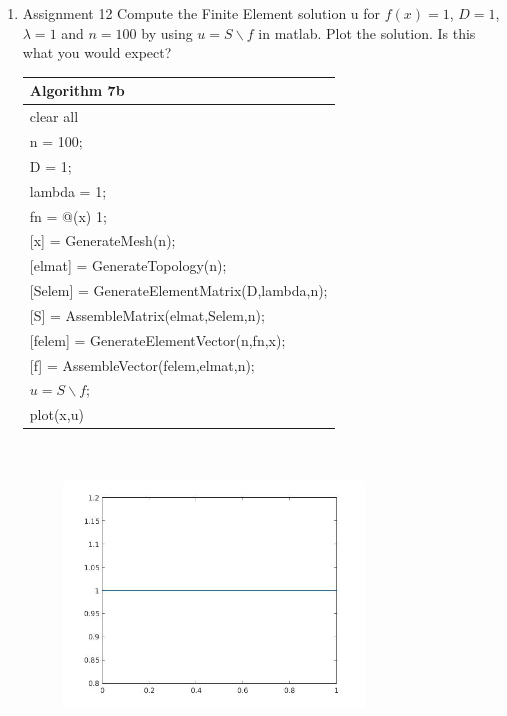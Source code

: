 \documentclass[a4paper,10pt]{report}
\begin{document}
\begin{enumerate}
\item{Assignment 12} Compute the Finite Element solution u for $f (x) = 1$, $D =
1$, $\lambda = 1$ and $n = 100$ by using $u = S\backslash f$ in matlab. Plot the solution. Is this
what you would expect?


\begin{table}
\begin{tabular}{ |l| } 
\hline
\textbf{Algorithm 7b}\\
\hline
\hspace{0.5cm}clear all\\
\hspace{0.5cm}n = 100;\\
\hspace{0.5cm}D = 1;\\
\hspace{0.5cm}lambda = 1;\\
\hspace{0.5cm}fn = @(x) 1;\\
\hspace{0.5cm}[x] = GenerateMesh(n);\\
\hspace{0.5cm}[elmat] = GenerateTopology(n);\\
\hspace{0.5cm}[Selem] = GenerateElementMatrix(D,lambda,n);\\
\hspace{0.5cm}[S] = AssembleMatrix(elmat,Selem,n);\\
\hspace{0.5cm}[felem] = GenerateElementVector(n,fn,x);\\
\hspace{0.5cm}[f] = AssembleVector(felem,elmat,n);\\
\hspace{0.5cm} $u = S\backslash f$;\\
\hspace{0.5cm}plot(x,u)\\
\hline
\end{tabular}
\end{table}
\begin{figure}
\centering 
\vspace{-10pt}
\includegraphics[width=8cm,height=8cm,keepaspectratio]{result1.jpg}

\end{figure}
\end{enumerate}
\end{document}
